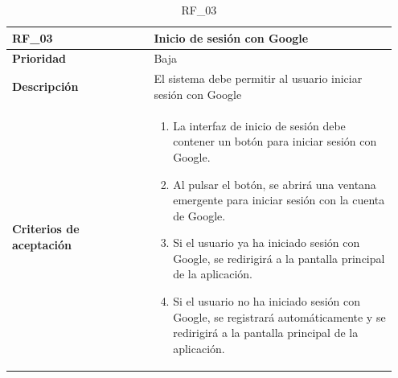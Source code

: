 \begin{table}[htb!]
    \begin{tabular}{|p{0.35\linewidth}|p{0.6\linewidth}|}
        \hline
        \rowcolor[HTML]{C0C0C0}  
        \textbf{RF\_03} & \textbf{Inicio de sesión con Google} \\
        \hline
        \textbf{Prioridad} & Baja \\
        \hline
        \textbf{Descripción} & El sistema debe permitir al usuario iniciar sesión con Google  \\
        \hline
        \vspace{0.5mm}
        \textbf{Criterios de aceptación} & 
        \begin{minipage}[t]{0.9\linewidth}
            \begin{enumerate}
                \item La interfaz de inicio de sesión debe contener un botón para iniciar sesión con Google.
                \item Al pulsar el botón, se abrirá una ventana emergente para iniciar sesión con la cuenta de Google.
                \item Si el usuario ya ha iniciado sesión con Google, se redirigirá a la pantalla principal de la aplicación.
                \item Si el usuario no ha iniciado sesión con Google, se registrará automáticamente y se redirigirá a la pantalla principal de la aplicación.
            \end{enumerate}
            \vspace{2mm}
        \end{minipage} \\
        \hline
    \end{tabular}
    \caption{RF\_03}
\end{table}

